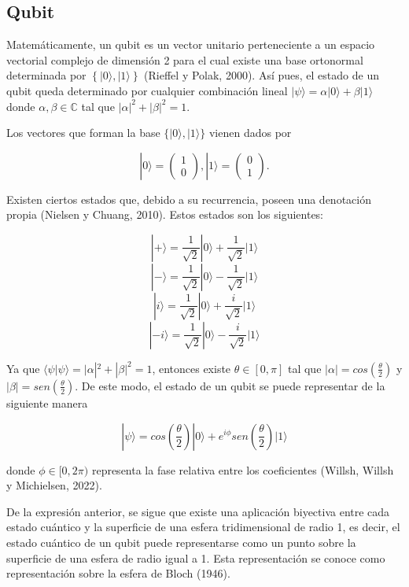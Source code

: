 \subsection{Qubit}

Matemáticamente, un qubit es un vector unitario perteneciente a un espacio vectorial complejo de dimensión 2 para el cual existe una base ortonormal determinada por $ \left \{ | 0 \rangle , | 1 \rangle  \right \}$ (Rieffel y Polak, 2000). Así pues, el estado de un qubit queda determinado por cualquier combinación lineal $ | \psi \rangle = \alpha | 0 \rangle + \beta | 1 \rangle $ donde $ \alpha, \beta \in \mathbb{C} $ tal que $ | \alpha |^2 + | \beta |^2=1 $.

Los vectores que forman la base $\{ |0 \rangle , |1 \rangle  \}$ vienen dados por

$$ |0 \rangle = \begin{pmatrix} 1\\ 0 \end{pmatrix}, |1 \rangle = \begin{pmatrix} 0\\ 1 \end{pmatrix}.$$

Existen ciertos estados que, debido a su recurrencia, poseen una denotación propia (Nielsen y Chuang, 2010). Estos estados son los siguientes:

$$ | + \rangle = \frac{1}{\sqrt{2}} | 0 \rangle + \frac{1}{\sqrt{2}} | 1 \rangle $$
$$ | - \rangle = \frac{1}{\sqrt{2}} | 0 \rangle - \frac{1}{\sqrt{2}} | 1 \rangle $$
$$ | i \rangle = \frac{1}{\sqrt{2}} | 0 \rangle + \frac{i}{\sqrt{2}} | 1 \rangle $$
$$ | -i \rangle = \frac{1}{\sqrt{2}} | 0 \rangle - \frac{i}{\sqrt{2}} | 1 \rangle $$

Ya que $ \langle \psi | \psi \rangle = | \alpha |^2 + | \beta |^2=1$, entonces existe $ \theta \in [0, \pi]$ tal que $ | \alpha | = cos ( \frac{\theta}{2} )$ y $ | \beta | = sen ( \frac{\theta}{2} )$. De este modo, el estado de un qubit se puede representar de la siguiente manera

$$ | \psi \rangle = cos ( \frac{\theta}{2}) | 0 \rangle + e^{i \phi} sen ( \frac{\theta}{2} ) | 1 \rangle  $$

donde $\phi \in [0 , 2 \pi)$ representa la fase relativa entre los coeficientes (Willsh, Willsh y Michielsen, 2022).

De la expresión anterior, se sigue que existe una aplicación biyectiva entre cada estado cuántico y la superficie de una esfera tridimensional de radio 1, es decir, el estado cuántico de un qubit puede representarse como un punto sobre la superficie de una esfera de radio igual a 1. Esta representación se conoce como representación sobre la esfera de Bloch (1946).



